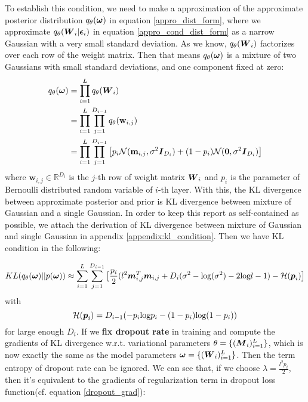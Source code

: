 To establish this condition, we need to make a approximation of the approximate posterior distribution $q_{\theta}(\boldsymbol \omega)$ in equation \ref{appro_dist_form}, where we approximate $q_{\theta}(\boldsymbol W_{i}|\boldsymbol \epsilon_{i})$ in equation \ref{appro_cond_dist_form} as a narrow Gaussian with a very small standard deviation. As we know, $q_{\theta}(\boldsymbol W_{i})$ factorizes over each row of the weight matrix. Then that means $q_{\theta}(\boldsymbol \omega)$ is a mixture of two Gaussians with small standard deviations, and one component fixed at zero:
\begin{equation}\label{appro_dist_guassian}
\begin{aligned}
q_{\theta}(\boldsymbol \omega) &= \prod_{i=1}^{L}q_{\theta}(\boldsymbol W_{i}) \\
&=\prod_{i=1}^{L}\prod_{j=1}^{D_{i-1}}q_{\theta}(\textbf{w}_{i,j}) \\
&= \prod_{i=1}^{L}\prod_{j=1}^{D_{i-1}} \big[ p_{i} \mathcal N(\textbf{m}_{i,j},\sigma^{2} \boldsymbol I_{D_{i}}) + (1-p_{i})\mathcal N(\boldsymbol 0, \sigma^{2} \boldsymbol I_{D_{i}})\big]
\end{aligned}
\end{equation}
where $\textbf{w}_{i,j} \in \mathbb R^{D_{i}}$ is the $j$-th row of weight matrix $\boldsymbol W_{i}$ and $p_{i}$ is the parameter of Bernoulli distributed random variable of $i$-th layer. With this, the KL divergence between approximate posterior and prior is KL divergence between mixture of Gaussian and a single Gaussian. In order to keep this report as self-contained as possible, we attach the derivation of KL divergence between mixture of Gaussian and single Gaussian in appendix \ref{appendix:kl_condition}. Then we have KL condition in the following:

\begin{equation}
\begin{aligned} \label{kl_condition}
KL(q_{\theta}(\boldsymbol \omega) || p(\boldsymbol \omega)) \approx \sum_{i=1}^{L} \sum_{j=1}^{D_{i-1}}
\big[
\frac{p_{i}}{2}(l^{2}\boldsymbol m_{i,j}^{T} \boldsymbol m_{i,j} + D_{i}( \sigma^{2} -\text{log}(\sigma^{2}) -2\text{log} l- 1) - \mathcal H (\boldsymbol p_{i}) 
\big] 
\end{aligned} 
\end{equation}
with 
\[
\mathcal H(\boldsymbol p_{i}) = D_{i-1}(-p_{i}\text{log}p_{i} - (1-p_{i})\text{log}(1-p_{i}))
\]
for large enough $D_{i}$. If we \textbf{fix dropout rate} in training and compute the gradients of KL divergence w.r.t. variational parameters $\theta = \{(\boldsymbol M_{i})_{i=1}^{L} \}$, which is now exactly the same as the model parameters $\boldsymbol \omega = \{(\boldsymbol W_i)_{i=1}^L\}$. Then the term entropy of dropout rate can be ignored.  We can see that, if we choose $\lambda = \frac{l^{2}p_{i}}{2}$, then it's equivalent to the gradients of regularization term in dropout loss function(cf. equation \ref{dropout_grad}):


